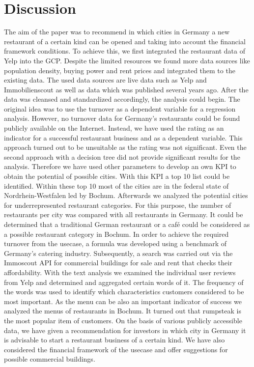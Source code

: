 \section{Discussion}
\label{sec:discussion}
The aim of the paper was to recommend in which cities in Germany a new restaurant of a certain kind can be opened and taking into account the financial framework conditions. To achieve this, we first integrated the restaurant data of Yelp into the \ac{GCP}. Despite the limited resources we found more data sources like population density, buying power and rent prices and integrated them to the existing data. The used data sources are live data such as Yelp and Immobilienscout as well as data which was published several years ago. After the data was cleansed and standardized accordingly, the analysis could begin. The original idea was to use the turnover as a dependent variable for a regression analysis. However, no turnover data for Germany's restaurants could be found publicly available on the Internet. Instead, we have used the rating as an indicator for a successful restaurant business and as a dependent variable. This approach turned out to be unsuitable as the rating was not significant. Even the second approach with a decision tree did not provide significant results for the analysis. Therefore we have used other parameters to develop an own \ac{KPI} to obtain the potential of possible cities. With this \ac{KPI} a top 10 list could be identified. Within these top 10 most of the cities are in the federal state of Nordrhein-Westfalen led by Bochum. Afterwards we analyzed the potential cities for underrepresented restaurant categories. For this purpose, the number of restaurants per city was compared with all restaurants in Germany. It could be determined that a traditional German restaurant or a café could be considered as a possible restaurant category in Bochum.
In order to achieve the required turnover from the usecase, a formula was developed using a benchmark of Germany's catering industry. Subsequently, a search was carried out via the Immoscout \ac{API} for commercial buildings for sale and rent that checks their affordability. %
With the text analysis we examined the individual user reviews from Yelp and determined and aggregated certain words of it. The frequency of the words was used to identify which characteristics customers considered to be most important. %
As the menu can be also an important indicator of success we analyzed the menus of restaurants in Bochum. It turned out that rumpsteak is the most popular item of customers. \newline
On the basis of various publicly accessible data, we have given a recommendation for investors in which city in Germany it is advisable to start a restaurant business of a certain kind. We have also considered the financial framework of the usecase and offer suggestions for possible commercial buildings.

